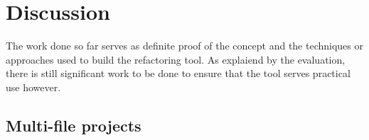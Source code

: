 \chapter{Discussion}\label{C:future}
The work done so far serves as definite proof of the concept and the techniques or approaches used to build the refactoring tool. As explaiend by the evaluation, there is still significant work to be done to ensure that the tool serves practical use however.



\section{Multi-file projects}



